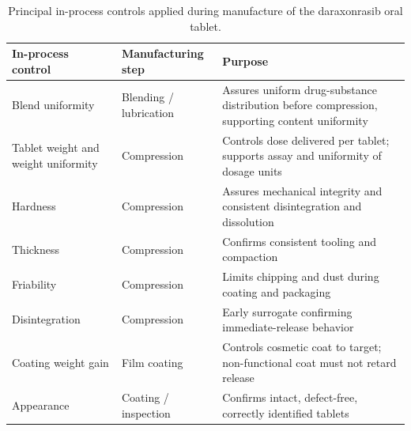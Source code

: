 \begin{table}[t]
\centering
\caption{Principal in-process controls applied during manufacture of the
daraxonrasib oral tablet.}
\label{tab:cmc-ipc}
\begin{tabularx}{\textwidth}{L{3.4cm} L{3.6cm} Y}
\toprule
\textbf{In-process control} & \textbf{Manufacturing step} & \textbf{Purpose} \\
\midrule
Blend uniformity & Blending / lubrication & Assures uniform drug-substance distribution before compression, supporting content uniformity \\
Tablet weight and weight uniformity & Compression & Controls dose delivered per tablet; supports assay and uniformity of dosage units \\
Hardness & Compression & Assures mechanical integrity and consistent disintegration and dissolution \\
Thickness & Compression & Confirms consistent tooling and compaction \\
Friability & Compression & Limits chipping and dust during coating and packaging \\
Disintegration & Compression & Early surrogate confirming immediate-release behavior \\
Coating weight gain & Film coating & Controls cosmetic coat to target; non-functional coat must not retard release \\
Appearance & Coating / inspection & Confirms intact, defect-free, correctly identified tablets \\
\bottomrule
\end{tabularx}
\vspace*{-0.2cm}
\end{table}

